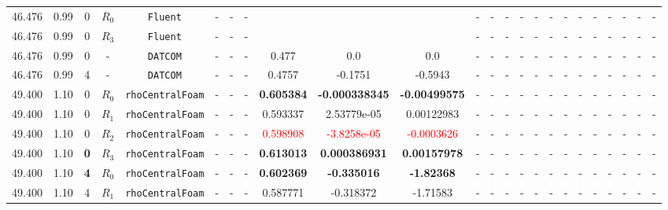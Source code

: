 \documentclass[12pt]{article}
\begin{document}
\begin{table}[H]
{\begin{tabular}{ccccc|ccc|ccc|ccc|ccc|ccccccc}
        \rowcolor{red!10}
        46.476 &  0.99 & 0 & $R_0$ & \texttt{Fluent} & - & - & - &  & & & - & - & - & - & - & - & - & - & - & - & - & - & - \\ 
        \rowcolor{red!40}
        46.476 &  0.99 & 0 & $R_3$ & \texttt{Fluent} & - & - & - &  & & & - & - & - & - & - & - & - & - & - & - & - & - & - \\ 
        \rowcolor{gray!10}
        46.476 &  0.99 & 0 & - & \texttt{DATCOM} & - & - & - & 0.477 & 0.0 & 0.0 & - & - & - & - & - & - & - & - & - & - & - & - & - \\ 
        \rowcolor{gray!10}
        46.476 &  0.99 & 4 & - & \texttt{DATCOM} & - & - & - & 0.4757 & -0.1751 & -0.5943 & - & - & - & - & - & - & - & - & - & - & - & - & - \\ \hline 
        \rowcolor{green!10}
        49.400 & 1.10 & 0 & $R_0$ & \texttt{rhoCentralFoam} & - & - & - & \textbf{0.605384} & \textbf{-0.000338345} & \textbf{-0.00499575} & - & - & - & - & - & - & - & - & - & - & - & - & - \\ 
        \rowcolor{green!20}
        49.400 & 1.10 & 0 & $R_1$ & \texttt{rhoCentralFoam} & - & - & - & 0.593337 & 2.53779e-05 & 0.00122983 & - & - & - & - & - & - & - & - & - & - & - & - & - \\
        \rowcolor{green!30}
        49.400 & 1.10 & 0 & $R_2$ & \texttt{rhoCentralFoam} & - & - & - & \textcolor{red}{0.598908} & \textcolor{red}{-3.8258e-05} & \textcolor{red}{-0.0003626} & - & - & - & - & - & - & - & - & - & - & - & - & - \\
        \rowcolor{green!40}
        49.400 & 1.10 & \cellcolor{lime}\textbf{0} & \cellcolor{cyan}$R_3$ & \texttt{rhoCentralFoam} & - & - & - & \textbf{0.613013} & \textbf{0.000386931} & \textbf{0.00157978} & - & - & - & - & - & - & - & - & - & - & - & - & - \\
        \rowcolor{green!10}
        49.400 & 1.10 & \textbf{4} & $R_0$ & \texttt{rhoCentralFoam} & - & - & - & \textbf{0.602369} & \textbf{-0.335016} & \textbf{-1.82368} & - & - & - & - & - & - & - & - & - & - & - & - & - \\
        \rowcolor{green!20}
        49.400 & 1.10 & 4 & $R_1$ & \texttt{rhoCentralFoam} & - & - & - & 0.587771 & -0.318372 & -1.71583 & - & - & - & - & - & - & - & - & - & - & - & - & - \\

\end{tabular}}
\end{table}
\end{document}
